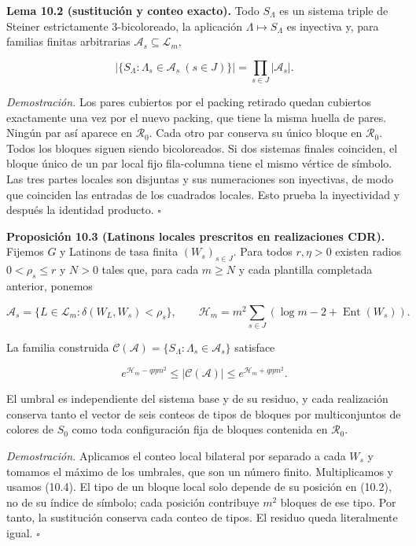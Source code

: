 \documentclass[spanish,11pt,a4paper]{article}
\begin{document}
\textbf{Lema 10.2 (sustitución y conteo exacto).} Todo \(S_\Lambda\) es un sistema triple de Steiner estrictamente 3-bicoloreado, la aplicación \(\Lambda\mapsto S_\Lambda\) es inyectiva y, para familias finitas arbitrarias \(\mathcal A_s\subseteq\mathcal L_m\),

\nopagebreak[4]
\[\left|\{S_\Lambda:\Lambda_s\in\mathcal A_s\ (s\in J)\}\right|
=\prod_{s\in J}|\mathcal A_s|.\tag{10.4}\]

\emph{Demostración.} Los pares cubiertos por el packing retirado quedan cubiertos exactamente una vez por el nuevo packing, que tiene la misma huella de pares. Ningún par así aparece en \(\mathcal R_0\). Cada otro par conserva su único bloque en \(\mathcal R_0\). Todos los bloques siguen siendo bicoloreados. Si dos sistemas finales coinciden, el bloque único de un par local fijo fila-columna tiene el mismo vértice de símbolo. Las tres partes locales son disjuntas y sus numeraciones son inyectivas, de modo que coinciden las entradas de los cuadrados locales. Esto prueba la inyectividad y después la identidad producto. \(\square\)

\textbf{Proposición 10.3 (Latinons locales prescritos en realizaciones CDR).} Fijemos \(G\) y Latinons de tasa finita \((W_s)_{s\in J}\). Para todos \(r,\eta>0\) existen radios \(0<\rho_s\le r\) y \(N>0\) tales que, para cada \(m\ge N\) y cada plantilla completada anterior, ponemos

\nopagebreak[4]
\[\mathcal A_s=\{L\in\mathcal L_m:\delta(W_L,W_s)<\rho_s\},\qquad
\mathcal H_m=m^2\sum_{s\in J}(\log m-2+\operatorname{Ent}(W_s)).\tag{10.5}\]

La familia construida \(\mathcal C(\mathcal A)=\{S_\Lambda:\Lambda_s\in\mathcal A_s\}\) satisface

\nopagebreak[4]
\[e^{\mathcal H_m-q\eta m^2}\le|\mathcal C(\mathcal A)|\le e^{\mathcal H_m+q\eta m^2}.\tag{10.6}\]

El umbral es independiente del sistema base y de su residuo, y cada realización conserva tanto el vector de seis conteos de tipos de bloques por multiconjuntos de colores de \(S_0\) como toda configuración fija de bloques contenida en \(\mathcal R_0\).

\emph{Demostración.} Aplicamos el conteo local bilateral por separado a cada \(W_s\) y tomamos el máximo de los umbrales, que son un número finito. Multiplicamos y usamos (10.4). El tipo de un bloque local solo depende de su posición en (10.2), no de su índice de símbolo; cada posición contribuye \(m^2\) bloques de ese tipo. Por tanto, la sustitución conserva cada conteo de tipos. El residuo queda literalmente igual. \(\square\)
\end{document}
